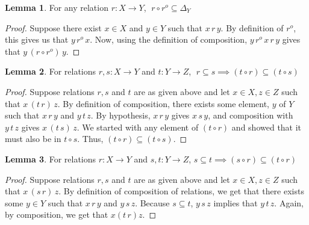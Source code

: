 \documentclass[18pt,a4paper]{article}
\theoremstyle{definition}
\newtheorem{lemma}{Lemma}[definition]
\begin{document}
\begin{lemma}
	For any relation $r:X \to Y$, $\; r \circ r^o \subseteq \Delta_Y$
\end{lemma}
\begin{proof}
	Suppose there exist $x \in X$ and $y \in Y$ such that
	$x\,r\,y$. By definition of $r^o$, this
	gives us that $y\, r^o \,x$. Now, using the definition of composition,
	$y\, r^o \,x \,r\,y$ gives that	$y\, (r \circ r^o)\, y$.
\end{proof}
\begin{lemma} For relations $r,s:X\to Y$ and $t:Y\to Z$,
	 $\;r \subseteq s \implies (t \circ r) \subseteq (t \circ s)$
\end{lemma}
\begin{proof}
	Suppose relations $r,s$ and $t$ are as given above and let $x \in X, z\in Z$ such that
	$x \,(t \, r)\,z$. By definition of composition, there
	exists some element, $y$ of $Y$ such that $x\,r\,y$ and $y\,t\,z$.
	By hypothesis, $x\,r\,y$ gives $x\,s\,y$, and composition with $y \, t \, z $
	gives $x\,(t\,s)\, z$. We started with any element of $(t \circ r)$ and showed that
	it must also be in $t \circ s$. Thus, $(t \circ r) \subseteq (t \circ s)$.
\end{proof}
\begin{lemma} For relations $r:X\to Y$ and $s,t:Y\to Z$,
	$s\subseteq t \implies (s \circ r) \subseteq
	(t \circ r)$
\end{lemma}
\begin{proof}
	Suppose relations $r,s$ and $t$ are as given above and let $x \in X, z\in Z$ such that
	$x \,(s \, r)\,z$. By definition of composition of relations, we get that there exists
	some $y \in Y$ such that $x\,r\,y$ and $y\,s\,z$. Because $s \subseteq t$, $y\,s\,z$
	implies that $y\,t\,z$. Again, by composition, we get that $x(t\,r)z$.
\end{proof}
\end{document}
